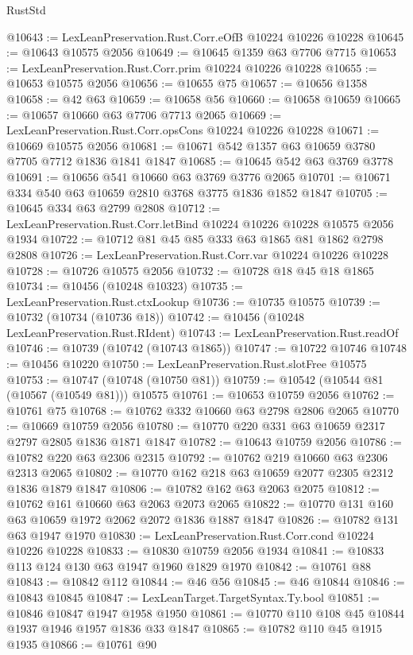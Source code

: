 \begin{lexlean}{RustStd}
\begin{coremodule}
@10643 := LexLeanPreservation.Rust.Corr.eOfB @10224 @10226 @10228
@10645 := @10643 @10575 @2056
@10649 := @10645 @1359 @63 @7706 @7715
@10653 := LexLeanPreservation.Rust.Corr.prim @10224 @10226 @10228
@10655 := @10653 @10575 @2056
@10656 := @10655 @75
@10657 := @10656 @1358
@10658 := @42 @63
@10659 := @10658 @56
@10660 := @10658 @10659
@10665 := @10657 @10660 @63 @7706 @7713 @2065
@10669 := LexLeanPreservation.Rust.Corr.opsCons @10224 @10226 @10228
@10671 := @10669 @10575 @2056
@10681 := @10671 @542 @1357 @63 @10659 @3780 @7705 @7712 @1836 @1841 @1847
@10685 := @10645 @542 @63 @3769 @3778
@10691 := @10656 @541 @10660 @63 @3769 @3776 @2065
@10701 := @10671 @334 @540 @63 @10659 @2810 @3768 @3775 @1836 @1852 @1847
@10705 := @10645 @334 @63 @2799 @2808
@10712 := LexLeanPreservation.Rust.Corr.letBind @10224 @10226 @10228 @10575 @2056 @1934
@10722 := @10712 @81 @45 @85 @333 @63 @1865 @81 @1862 @2798 @2808
@10726 := LexLeanPreservation.Rust.Corr.var @10224 @10226 @10228
@10728 := @10726 @10575 @2056
@10732 := @10728 @18 @45 @18 @1865
@10734 := @10456 (@10248 @10323)
@10735 := LexLeanPreservation.Rust.ctxLookup
@10736 := @10735 @10575
@10739 := @10732 (@10734 (@10736 @18))
@10742 := @10456 (@10248 LexLeanPreservation.Rust.RIdent)
@10743 := LexLeanPreservation.Rust.readOf
@10746 := @10739 (@10742 (@10743 @1865))
@10747 := @10722 @10746
@10748 := @10456 @10220
@10750 := LexLeanPreservation.Rust.slotFree @10575
@10753 := @10747 (@10748 (@10750 @81))
@10759 := @10542 (@10544 @81 (@10567 (@10549 @81))) @10575
@10761 := @10653 @10759 @2056
@10762 := @10761 @75
@10768 := @10762 @332 @10660 @63 @2798 @2806 @2065
@10770 := @10669 @10759 @2056
@10780 := @10770 @220 @331 @63 @10659 @2317 @2797 @2805 @1836 @1871 @1847
@10782 := @10643 @10759 @2056
@10786 := @10782 @220 @63 @2306 @2315
@10792 := @10762 @219 @10660 @63 @2306 @2313 @2065
@10802 := @10770 @162 @218 @63 @10659 @2077 @2305 @2312 @1836 @1879 @1847
@10806 := @10782 @162 @63 @2063 @2075
@10812 := @10762 @161 @10660 @63 @2063 @2073 @2065
@10822 := @10770 @131 @160 @63 @10659 @1972 @2062 @2072 @1836 @1887 @1847
@10826 := @10782 @131 @63 @1947 @1970
@10830 := LexLeanPreservation.Rust.Corr.cond @10224 @10226 @10228
@10833 := @10830 @10759 @2056 @1934
@10841 := @10833 @113 @124 @130 @63 @1947 @1960 @1829 @1970
@10842 := @10761 @88
@10843 := @10842 @112
@10844 := @46 @56
@10845 := @46 @10844
@10846 := @10843 @10845
@10847 := LexLeanTarget.TargetSyntax.Ty.bool
@10851 := @10846 @10847 @1947 @1958 @1950
@10861 := @10770 @110 @108 @45 @10844 @1937 @1946 @1957 @1836 @33 @1847
@10865 := @10782 @110 @45 @1915 @1935
@10866 := @10761 @90

\end{coremodule}
\end{lexlean}
